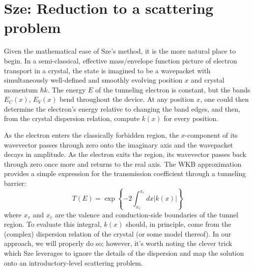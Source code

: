 \section{Sze: Reduction to a scattering problem}
Given the mathematical ease of Sze's method, it is the more natural place to begin.  In a semi-classical, effective mass/envelope function picture of electron transport in a crystal, the state is imagined to be a wavepacket with simultaneously well-defined and smoothly evolving position $x$ and crystal momentum $\hbar k$.  The energy $E$ of the tunneling electron is constant, but the bands $E_C(x)$, $E_V(x)$ bend throughout the device.  At any position $x$, one could then determine the electron's energy relative to changing the band edges, and then, from the crystal dispersion relation, compute $k(x)$ for every position.

As the electron enters the classically forbidden region, the $x$-component of its wavevector passes through zero onto the imaginary axis and the wavepacket decays in amplitude.  As the electron exits the region, its wavevector passes back through zero once more and returns to the real axis.  The WKB approximation provides a simple expression for the transmission coefficient through a tunneling barrier:
$$T(E)=\exp\left\{-2\int_{x_v}^{x_c}dx|k(x)|\right\}$$
where $x_v$ and $x_c$ are the valence and conduction-side boundaries of the tunnel region.  To evaluate this integral, $k(x)$ should, in principle, come from the (complex) dispersion relation of the crystal (or some model thereof).  In our approach, we will properly do so; however, it's worth noting the clever trick which Sze leverages to ignore the details of the dispersion and map the solution onto an introductory-level scattering problem.